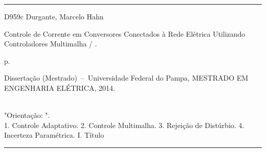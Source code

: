 
\vspace*{\fill}					%
\hrule							%
\begin{center}					%
	\begin{minipage}[c]{12.5cm}		%
	
		D959c Durgante, Marcelo Hahn
	
		\hspace{1cm} Controle de Corrente em Conversores Conectados à Rede Elétrica Utilizando Controladores Multimalha / \imprimirautor.
	
		\hspace{1cm} \pageref{LastPage} p.\\
	
		\hspace{1cm}
		\parbox[t]{\textwidth}{Dissertação (Mestrado)~--~Universidade Federal do Pampa,
		MESTRADO EM ENGENHARIA ELÉTRICA, 2014.}\\
	
		\hspace{1cm} "Orientação: \imprimirorientador".\\
	
		\hspace{1cm}
			1. Controle Adaptativo.
			2. Controle Multimalha.
			3. Rejeição de Distúrbio.
			4. Incerteza Paramétrica.
			I. Título

	\end{minipage}
\end{center}
\hrule

